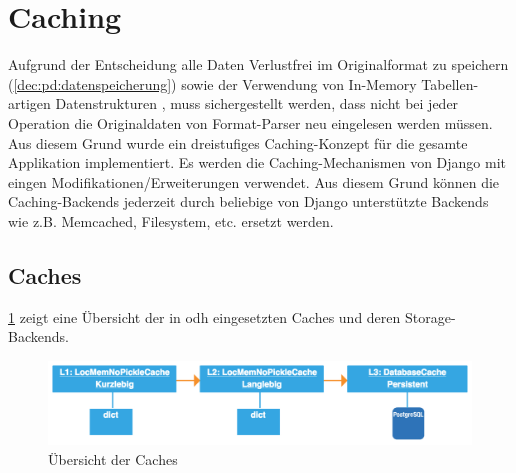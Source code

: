 
\section{Caching}
Aufgrund der Entscheidung alle Daten Verlustfrei im Originalformat zu speichern (\cref{dec:pd:datenspeicherung}) sowie der Verwendung von In-Memory Tabellen-artigen Datenstrukturen , muss sichergestellt werden, dass nicht bei jeder Operation die Originaldaten von Format-Parser neu eingelesen werden müssen.\\

Aus diesem Grund wurde ein dreistufiges Caching-Konzept für die gesamte Applikation implementiert. Es werden die Caching-Mechanismen von Django mit eingen Modifikationen/Erweiterungen verwendet. Aus diesem Grund können die Caching-Backends jederzeit durch beliebige von Django unterstützte Backends wie z.B. Memcached, Filesystem, etc. ersetzt werden.

\subsection{Caches}

\cref{fig:pd:caches} zeigt eine Übersicht der in \gls{odh} eingesetzten Caches und deren Storage-Backends.

\begin{figure}[H]
\centering
\includegraphics[width=\linewidth]{fig/caching.pdf}
\caption{Übersicht der Caches}
\label{fig:pd:caches}
\end{figure}


